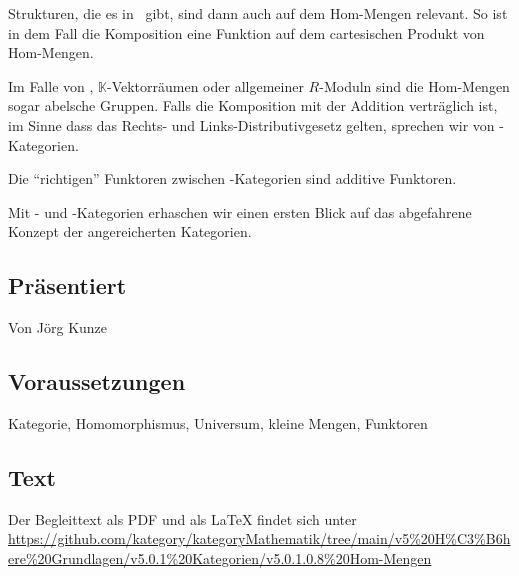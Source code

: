 \documentclass[a4paper]{amsart}
\theoremstyle{definition}
\newcommand{\K}{\ensuremath{\mathbb{ K }}}
\newcommand{\Set}{\text{\textbf{Set}}}
\newcommand{\Ab}{\text{\textbf{Ab}}}
\begin{document}
Strukturen, die es in \Set\ gibt, sind dann auch auf dem Hom-Mengen relevant. So ist in dem Fall die Komposition eine Funktion auf dem cartesischen Produkt von Hom-Mengen.

Im Falle von \Ab, $\K$-Vektorräumen oder allgemeiner $R$-Moduln sind die Hom-Mengen sogar abelsche Gruppen. Falls die Komposition mit der Addition verträglich ist, im Sinne dass das Rechts- und Links-Distributivgesetz gelten, sprechen wir von \Ab-Kategorien.

Die "`richtigen"' Funktoren zwischen \Ab-Kategorien sind additive Funktoren.

Mit \Set- und \Ab-Kategorien erhaschen wir einen ersten Blick auf das abgefahrene Konzept der angereicherten Kategorien.

\subsection*{Präsentiert}
Von Jörg Kunze

\subsection*{Voraussetzungen}
Kategorie, Homomorphismus, Universum, kleine Mengen, Funktoren

\subsection*{Text}
Der Begleittext als PDF und als LaTeX findet sich unter
{\tiny
   \url{https://github.com/kategory/kategoryMathematik/tree/main/v5%20H%C3%B6here%20Grundlagen/v5.0.1%20Kategorien/v5.0.1.0.8%20Hom-Mengen}
}

\end{document}
